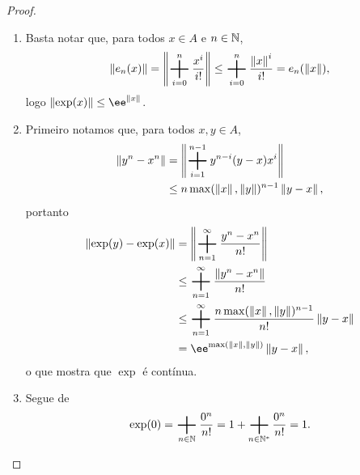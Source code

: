 \begin{proof}
	\begin{enumerate}
	\item Basta notar que, para todos $x \in A$ e $n \in \mathbb{N}$,
		\begin{equation*}
		\nor{e_n(x)} = \nor{\sum_{i=0}^{n} \frac{x^i}{i!}} \leq \sum_{i=0}^{n} \frac{\nor{x}^i}{i!} = e_n(\nor{x}),
		\end{equation*}
logo $\nor{\exp(x)} \leq \ee^{\nor{x}}$.
	
	\item Primeiro notamos que, para todos $x,y \in A$,
		\begin{align*}
		\nor{y^n-x^n} &= \nor{\sum_{i=1}^{n-1} y^{n-i}(y-x)x^i} \\
			&\leq n\max(\nor{x},\nor{y})^{n-1}\nor{y-x},
		\end{align*}
portanto
	\begin{align*}
	\nor{\exp(y) - \exp(x)} &= \nor{\sum_{n=1}^\infty \frac{y^n-x^n}{n!}} \\
		&\leq \sum_{n=1}^\infty \frac{\nor{y^n-x^n}}{n!} \\
		&\leq \sum_{n=1}^\infty \frac{n\max(\nor{x},\nor{y})^{n-1}}{n!} \nor{y-x} \\
		&= \ee^{\max(\nor{x},\nor{y})}\nor{y-x},
	\end{align*}
o que mostra que $\exp$ é contínua.
	
	\item Segue de
		\begin{equation*}
		\exp(0) = \sum_{n \in \N} \frac{0^n}{n!} = 1 + \sum_{n \in \N^*} \frac{0^n}{n!} = 1.
		\end{equation*}


\end{enumerate}
\end{proof}
